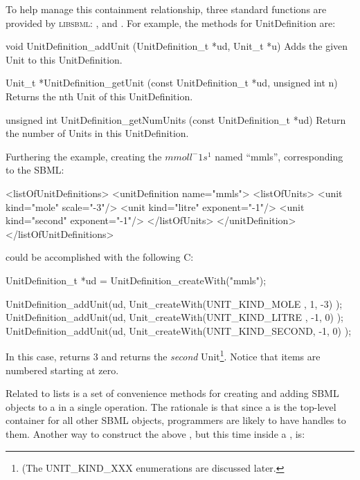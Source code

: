 \documentclass{sbmlmanual}
\newcommand{\libsbml}{\textsc{libsbml}}
\begin{document}
To help manage this containment relationship, three standard functions are
provided by \libsbml{}: ,  and
.  For example, the methods for UnitDefinition
are:


\begin{methoddef}{void UnitDefinition\_addUnit (UnitDefinition\_t *ud,
Unit\_t *u)}
  Adds the given Unit to this UnitDefinition.
\end{methoddef}

\begin{methoddef}{Unit\_t *UnitDefinition\_getUnit (const UnitDefinition\_t
*ud, unsigned int n)}
Returns the nth Unit of this UnitDefinition.
\end{methoddef}

\begin{methoddef}{unsigned int UnitDefinition\_getNumUnits (const
UnitDefinition\_t *ud)}
  Return the number of Units in this UnitDefinition.
\end{methoddef}


Furthering the example, creating the  $mmol l^-1
s^1$ named ``mmls'', corresponding to the SBML:

\begin{example}
<listOfUnitDefinitions>
  <unitDefinition name="mmls">
    <listOfUnits>
      <unit kind="mole"   scale="-3"/>
      <unit kind="litre"  exponent="-1"/>
      <unit kind="second" exponent="-1"/>
    </listOfUnits>
  </unitDefinition>
</listOfUnitDefinitions>
\end{example}


could be accomplished with the following C:

\begin{example}[c]
UnitDefinition_t *ud = UnitDefinition_createWith("mmls");

UnitDefinition_addUnit(ud, Unit_createWith(UNIT_KIND_MOLE  ,  1, -3) );
UnitDefinition_addUnit(ud, Unit_createWith(UNIT_KIND_LITRE , -1,  0) );
UnitDefinition_addUnit(ud, Unit_createWith(UNIT_KIND_SECOND, -1,  0) );
\end{example}


In this case, 
returns 3 and 
returns the \emph{second} Unit\footnote{(The UNIT\_KIND\_XXX
enumerations are discussed later.}.  Notice that items are numbered
starting at zero.

Related to lists is a set of convenience methods for creating and
adding SBML objects to a  in a single operation.  The
rationale is that since a  is the top-level container for
all other SBML objects, programmers are likely to have handles to
them.  Another way to construct the above , but
this time inside a , is:
\end{document}
